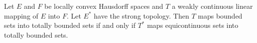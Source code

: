 Let $E$ and $F$ be locally convex Hausdorff spaces and $T$ a weakly continuous linear mapping of $E$ into $F$. Let $E^{*}$ have the strong topology. Then $T$ maps bounded sets into totally bounded sets if and only if $T^{*}$ maps equicontinuous sets into totally bounded sets.
